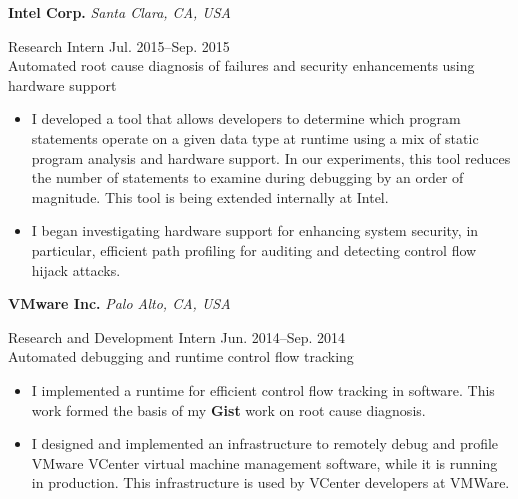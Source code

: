 \documentclass[10pt]{article}
\newcommand{\mysub}[3]{\textbf{#1} {#2} \hfill {\em #3}}
\newcommand{\myssub}[1]{\hspace*{2mm}\parbox{163mm}{#1}\vspace*{2mm}}
\begin{document}
\mysub{Intel Corp.}{}{Santa Clara, CA, USA} \\
\myssub{\vspace{1mm}Research Intern \hfill Jul. 2015--Sep. 2015\\
Automated root cause diagnosis of failures and security enhancements using hardware support
\vspace{-1mm}
\begin{itemize}
\setlength\itemsep{0em}
\item{I developed a tool that allows developers to determine which program statements operate on a given data type at runtime using a mix of static program analysis and hardware support. In our experiments, this tool reduces the number of statements to examine during debugging by an order of magnitude. This tool is being extended internally at Intel.}
\item{I began investigating hardware support for enhancing system security, in particular, efficient path profiling for auditing and detecting control flow hijack attacks.}
\end{itemize}
\vspace{-2mm}
}



\mysub{VMware Inc.}{}{Palo Alto, CA, USA} \\
\myssub{\vspace{1mm}Research and Development Intern \hfill Jun. 2014--Sep. 2014\\
Automated debugging and runtime control flow tracking
\vspace{-1mm}
\begin{itemize}
\setlength\itemsep{0em}
\item{I implemented a runtime for efficient control flow tracking in software. This work formed the basis of my \textbf{Gist} work on root cause diagnosis.}
\item{I designed and implemented an infrastructure to remotely debug and profile VMware VCenter virtual machine management software, while it is running in production. This infrastructure is used by VCenter developers at VMWare.}
\end{itemize}
\vspace{-2mm}
}
\end{document}
